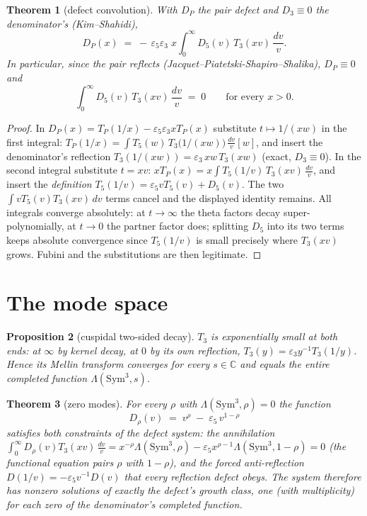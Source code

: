 \documentclass[11pt]{article}
\newtheorem{theorem}{Theorem}[section]
\newtheorem{proposition}[theorem]{Proposition}
\theoremstyle{remark}
\newcommand{\C}{\mathbb{C}}
\newcommand{\Sym}{\mathrm{Sym}}
\newcommand{\dv}{\,\frac{dv}{v}}
\begin{document}
\begin{theorem}[defect convolution]\label{thm:defect}
With $D_P$ the pair defect and $D_3\equiv0$ the denominator's
(Kim--Shahidi),
\[
D_P(x)\;=\;-\,\varepsilon_5\varepsilon_3\;x\int_0^\infty
D_5(v)\,T_3(xv)\dv .
\]
In particular, since the pair reflects
(Jacquet--Piatetski-Shapiro--Shalika), $D_P\equiv0$ and
\[
\int_0^\infty D_5(v)\,T_3(xv)\dv\;=\;0\qquad\text{for every }x>0 .
\]
\end{theorem}

\begin{proof}
In $D_P(x)=T_P(1/x)-\varepsilon_5\varepsilon_3 xT_P(x)$ substitute
$t\mapsto1/(xw)$ in the first integral:
$T_P(1/x)=\int T_5(w)\,T_3\!\bigl(1/(xw)\bigr)\dv[w]$, and insert the
denominator's reflection $T_3(1/(xw))=\varepsilon_3\,xw\,T_3(xw)$ (exact,
$D_3\equiv0$).  In the second integral substitute $t=xv$:
$xT_P(x)=x\int T_5(1/v)\,T_3(xv)\dv$, and insert the \emph{definition}
$T_5(1/v)=\varepsilon_5vT_5(v)+D_5(v)$.  The two $\int vT_5(v)T_3(xv)\,dv$
terms cancel and the displayed identity remains.  All integrals converge
absolutely: at $t\to\infty$ the theta factors decay super-polynomially, at
$t\to0$ the partner factor does; splitting $D_5$ into its two terms keeps
absolute convergence since $T_5(1/v)$ is small precisely where $T_3(xv)$
grows.  Fubini and the substitutions are then legitimate.
\end{proof}

\section{The mode space}

\begin{proposition}[cuspidal two-sided decay]\label{prop:decay}
$T_3$ is exponentially small at both ends: at $\infty$ by kernel decay, at
$0$ by its own reflection, $T_3(y)=\varepsilon_3y^{-1}T_3(1/y)$.  Hence its
Mellin transform converges for every $s\in\C$ and equals the entire
completed function $\Lambda(\Sym^3,s)$.
\end{proposition}

\begin{theorem}[zero modes]\label{thm:modes}
For every $\rho$ with $\Lambda(\Sym^3,\rho)=0$ the function
\[
D_\rho(v)\;=\;v^{\rho}\;-\;\varepsilon_5\,v^{1-\rho}
\]
satisfies both constraints of the defect system: the annihilation
$\int_0^\infty D_\rho(v)T_3(xv)\dv=
x^{-\rho}\Lambda(\Sym^3,\rho)-\varepsilon_5x^{\rho-1}\Lambda(\Sym^3,1-\rho)
=0$ (the functional equation pairs $\rho$ with $1-\rho$), and the forced
anti-reflection $D(1/v)=-\varepsilon_5v^{-1}D(v)$ that every reflection
defect obeys.  The system therefore has nonzero solutions of exactly the
defect's growth class, one (with multiplicity) for each zero of the
denominator's completed function.
\end{theorem}
\end{document}
